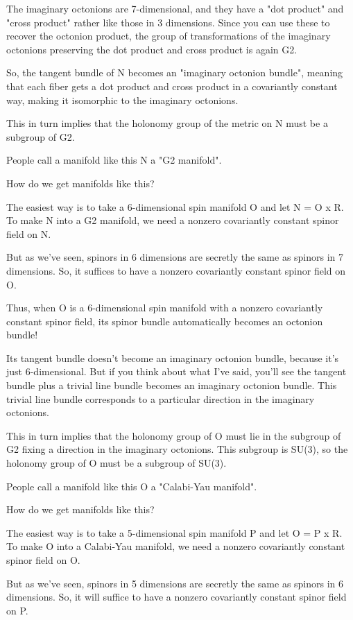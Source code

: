 The imaginary octonions are 7-dimensional, and they have a "dot
product" and "cross product" rather like those in 3
dimensions.  Since you can use these to recover the octonion product,
the group of transformations of the imaginary octonions preserving the
dot product and cross product is again G2.
 
So, the tangent bundle of N becomes an "imaginary octonion bundle", 
meaning that each fiber gets a dot product and cross product in a 
covariantly constant way, making it isomorphic to the imaginary octonions.

This in turn implies that the holonomy group of the metric on N must 
be a subgroup of G2.  

People call a manifold like this N a "G2 manifold".  

How do we get manifolds like this?

The easiest way is to take a 6-dimensional spin manifold O and let 
N = O x R.   To make N into a G2 manifold, we need a nonzero covariantly 
constant spinor field on N.  

But as we've seen, spinors in 6 dimensions are secretly the same 
as spinors in 7 dimensions.  So, it suffices to have a nonzero 
covariantly constant spinor field on O.  

Thus, when O is a 6-dimensional spin manifold with a nonzero 
covariantly constant spinor field, its spinor bundle automatically
becomes an octonion bundle!

Its tangent bundle doesn't become an imaginary octonion bundle,
because it's just 6-dimensional.  But if you think about what I've
said, you'll see the tangent bundle plus a trivial line bundle 
becomes an imaginary octonion bundle.  This trivial line bundle
corresponds to a particular direction in the imaginary octonions.

This in turn implies that the holonomy group of O must lie in the 
subgroup of G2 fixing a direction in the imaginary octonions.  
This subgroup is SU(3), so the holonomy group of O must be a 
subgroup of SU(3).  

People call a manifold like this O a "Calabi-Yau manifold".

How do we get manifolds like this?

The easiest way is to take a 5-dimensional spin manifold P and let 
O = P x R.   To make O into a Calabi-Yau manifold, we need a nonzero 
covariantly constant spinor field on O.

But as we've seen, spinors in 5 dimensions are secretly the same as
spinors in 6 dimensions.   So, it will suffice to have a nonzero
covariantly constant spinor field on P.


